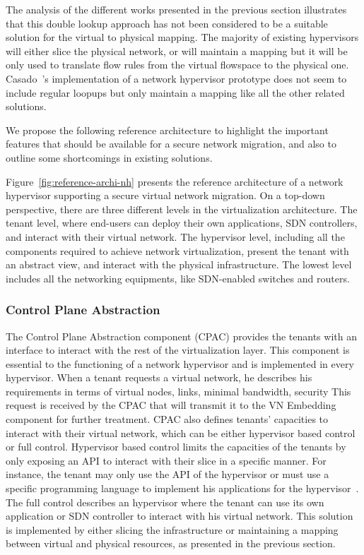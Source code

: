 The analysis of the different works presented in the previous section illustrates that this double lookup approach has not been considered to be a suitable solution for the virtual to physical mapping. The majority of existing hypervisors will either slice the physical network, or will maintain a mapping but it will be only used to translate flow rules from the virtual flowspace to the physical one. Casado~\etal's  implementation of a network hypervisor prototype does not seem to include regular loopups but only maintain a mapping like all the other related solutions.

We propose the following reference architecture to highlight the important features that should be available for a secure network migration, and also to outline some shortcomings in existing solutions.


  
Figure~\ref{fig:reference-archi-nh} presents the reference architecture of a network hypervisor supporting a secure virtual network migration.
On a top-down perspective, there are three different levels in the virtualization architecture.
The tenant level, where end-users can deploy their own applications, SDN controllers, and interact with their virtual network.
The hypervisor level, including all the components required to achieve network virtualization, present the tenant with an abstract view, and interact with the physical infrastructure.
The lowest level includes all the networking equipments, like SDN-enabled switches and routers.

\subsubsection{Control Plane Abstraction}
The Control Plane Abstraction component (CPAC) provides the tenants with an interface to interact with the rest of the virtualization layer.
This component is essential to the functioning of a network hypervisor and is implemented in every hypervisor.
When a tenant requests a virtual network, he describes his requirements in terms of virtual nodes, links, minimal bandwidth, security \etc This request is received by the CPAC that will transmit it to the VN Embedding component for further treatment.
CPAC also defines tenants' capacities to interact with their virtual network, which can be either hypervisor based control or full control.
Hypervisor based control limits the capacities of the tenants by only exposing an API to interact with their slice in a specific manner. For instance, the tenant may only use the API of the hypervisor or must use a specific programming language to implement his applications for the hypervisor~\cite{CompositionalHypervisor-Jin2014,NetworkHypervisor-Huang2013}. 
The full control describes an hypervisor where the tenant can use its own application or SDN controller to interact with his virtual network. This solution is implemented by either slicing the infrastructure or maintaining a mapping between virtual and physical resources, as presented in the previous section.



